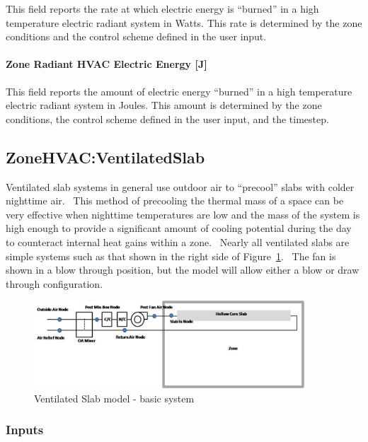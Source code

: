 This field reports the rate at which electric energy is ``burned'' in a high temperature electric radiant system in Watts. This rate is determined by the zone conditions and the control scheme defined in the user input.

\paragraph{Zone Radiant HVAC Electric Energy {[}J{]}}\label{zone-radiant-hvac-electric-energy-j-1}

This field reports the amount of electric energy ``burned'' in a high temperature electric radiant system in Joules. This amount is determined by the zone conditions, the control scheme defined in the user input, and the timestep.

\subsection{ZoneHVAC:VentilatedSlab}\label{zonehvacventilatedslab}

Ventilated slab systems in general use outdoor air to ``precool'' slabs with colder nighttime air.~ This method of precooling the thermal mass of a space can be very effective when nighttime temperatures are low and the mass of the system is high enough to provide a significant amount of cooling potential during the day to counteract internal heat gains within a zone.~ Nearly all ventilated slabs are simple systems such as that shown in the right side of Figure~\ref{fig:ventilated-slab-model-basic-system}.~ The fan is shown in a blow through position, but the model will allow either a blow or draw through configuration.

\begin{figure}[hbtp] %
\centering
\includegraphics[width=0.9\textwidth, height=0.9\textheight, keepaspectratio=true]{media/image321.png}
\caption{Ventilated Slab model - basic system \protect \label{fig:ventilated-slab-model-basic-system}}
\end{figure}

\subsubsection{Inputs}\label{inputs-10-014}

